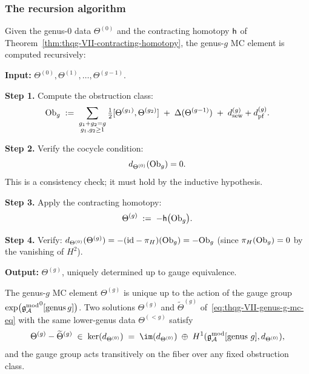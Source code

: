 \subsubsection{The recursion algorithm}
\label{subsubsec:thqg-VII-recursion-algorithm}

\begin{construction}
\label{constr:thqg-VII-mc-recursion}
Given the genus-$0$ data $\Theta^{(0)}$ and the contracting
homotopy $\mathsf{h}$ of
Theorem~\textup{\ref{thm:thqg-VII-contracting-homotopy}},
the genus-$g$ MC element is computed recursively:

\medskip
\noindent
\textbf{Input:} $\Theta^{(0)}, \Theta^{(1)}, \ldots,
\Theta^{(g-1)}$.

\medskip
\noindent
\textbf{Step 1.} Compute the obstruction class:
\begin{equation}\label{eq:thqg-VII-recursion-obs}
\mathrm{Ob}_g
\;:=\;
\sum_{\substack{g_1+g_2=g \\ g_1,g_2 \geq 1}}
\tfrac{1}{2}[\Theta^{(g_1)},\Theta^{(g_2)}]
\;+\;
\Delta(\Theta^{(g-1)})
\;+\;
d_{\mathrm{sew}}^{(g)} + d_{\mathrm{pf}}^{(g)}.
\end{equation}

\textbf{Step 2.} Verify the cocycle condition:
\begin{equation}\label{eq:thqg-VII-recursion-cocycle}
d_{\Theta^{(0)}}(\mathrm{Ob}_g) = 0.
\end{equation}
This is a consistency check; it must hold by the inductive
hypothesis.

\textbf{Step 3.} Apply the contracting homotopy:
\begin{equation}\label{eq:thqg-VII-recursion-solve}
\Theta^{(g)}
\;:=\;
-\mathsf{h}\bigl(\mathrm{Ob}_g\bigr).
\end{equation}

\textbf{Step 4.} Verify:
$d_{\Theta^{(0)}}(\Theta^{(g)})
= -(\mathrm{id} - \pi_H)(\mathrm{Ob}_g)
= -\mathrm{Ob}_g$
(since $\pi_H(\mathrm{Ob}_g) = 0$ by the vanishing of $H^2$).

\medskip
\noindent
\textbf{Output:} $\Theta^{(g)}$, uniquely determined up to
gauge equivalence.
\end{construction}

\begin{theorem}
\label{thm:thqg-VII-uniqueness}
The genus-$g$ MC element $\Theta^{(g)}$ is unique up to the
action of the gauge group
$\exp\bigl({\mathfrak{g}_{\mathcal{A}}^{\mathrm{mod}}}^0[\mathrm{genus\,}g]\bigr)$.
Two solutions $\Theta^{(g)}$ and $\widetilde{\Theta}^{(g)}$
of~\eqref{eq:thqg-VII-genus-g-mc-eq} with the same
lower-genus data $\Theta^{(<g)}$ satisfy
\begin{equation}\label{eq:thqg-VII-gauge-diff}
\Theta^{(g)} - \widetilde{\Theta}^{(g)}
\;\in\;
\ker(d_{\Theta^{(0)}})
\;=\;
\im(d_{\Theta^{(0)}})
\;\oplus\;
H^1(\gAmod[\text{genus }g], d_{\Theta^{(0)}}),
\end{equation}
and the gauge group acts transitively on the fiber over any
fixed obstruction class.
\end{theorem}

